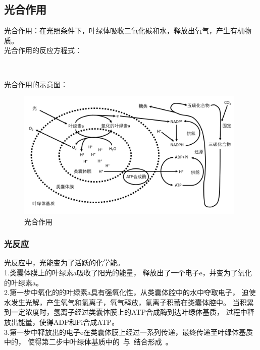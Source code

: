 \documentclass[UTF8]{ctexart}
\begin{document}
\newpage
    
\subsection{光合作用}
    光合作用：在光照条件下，叶绿体吸收二氧化碳和水，释放出氧气，产生有机物质。\\[3mm]
    光合作用的反应方程式：
    \begin{center}
        \\[4mm]
    \end{center}
    光合作用的示意图：
    \begin{figure}[h!]
        \begin{center}
            \includegraphics[width=11cm]{BiologyImage/12.jpg}
            \caption{光合作用}
        \end{center}
    \end{figure}\vspace{-20pt}
    
\subsubsection{光反应}
    光反应中，光能变为了活跃的化学能。\\[3mm]
    1.类囊体膜上的叶绿素a吸收了阳光的能量，
    释放出了一个电子e，并变为了氧化的叶绿素a。\\[3mm]
    2.第一步中氧化的的叶绿素a具有强氧化性，从类囊体腔中的水中夺取电子，
    迫使水发生光解，产生氧气和氢离子，氧气释放，氢离子积蓄在类囊体腔中。
    当积累到一定浓度时，氢离子经过类囊体膜上的ATP合成酶到达叶绿体基质，
    过程中释放出能量，使得ADP和Pi合成ATP。\\[3mm]
    3.第一步中释放出的电子e在类囊体膜上经过一系列传递，最终传递至叶绿体基质中的，
    使得第二步中叶绿体基质中的~与~结合形成~。
    
\end{document}
